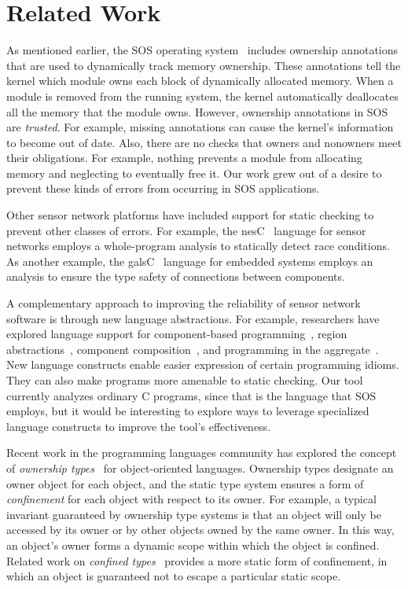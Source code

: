 \section{Related Work}
\label{sec:related}

As mentioned earlier, the SOS operating system~\cite{sos} includes
ownership annotations that are used to dynamically track memory
ownership.  These annotations tell the kernel which module owns each
block of dynamically allocated memory.  When a module is removed from
the running system, the kernel automatically deallocates all the
memory that the module owns.  However, ownership annotations in SOS
are {\em trusted}.  For example, missing annotations can
cause the kernel's information to become out of date.  Also, there are
no checks that owners and nonowners meet their obligations.  For
example, nothing prevents a module from allocating memory and
neglecting to eventually free it.
Our work grew out of a desire to prevent these kinds of
errors from occurring in SOS applications.

Other sensor network platforms have included support for static
checking to prevent other classes of errors.  For example, the nesC~\cite{nesC}
language for sensor networks employs
a whole-program analysis to statically detect race conditions.
As another example, the galsC~\cite{TinyGALS, galsC} language for
embedded systems employs an analysis to ensure the type
safety of connections between components.

A complementary approach to improving the reliability of sensor
network software is through new language abstractions.  For example,
researchers have explored language support for component-based
programming~\cite{TinyOS,nesC,galsC},
region
abstractions~\cite{conf/mobisys/WhitehouseSCB04,conf/nsdi/WelshM04},
component composition~\cite{conf/sensys/GreensteinKE04}, and
programming in the aggregate~\cite{1052213,conf/dcoss/GummadiGG05}.
New language constructs 
enable easier expression of certain
programming idioms.  They can also make programs more amenable to 
static checking.  Our tool currently analyzes
ordinary C programs, since that is the language that SOS employs, but
it would be interesting to explore ways to leverage specialized
language constructs to improve the tool's effectiveness.



Recent work in the programming languages community has explored the
concept of {\em ownership
  types}~\cite{ownership,ownership2,BoyapatiEtAl02,aliasjava} for
object-oriented languages.  Ownership types designate an owner object for
each object, and the static type system ensures a form of {\em
  confinement} for each object with respect to its owner.  For
example, a typical invariant guaranteed by ownership type systems is
that an object will
only be accessed by its owner or by other objects owned by
the same owner.  In this way, an object's owner forms a dynamic scope
within which the object is confined.  Related work on {\em confined
  types}~\cite{confined1,confined2} provides a more static form of
confinement, in which an object is guaranteed not to escape a
particular static scope.

